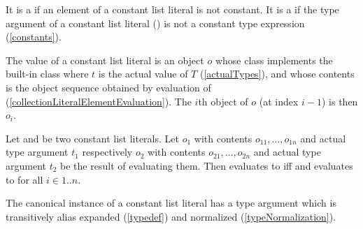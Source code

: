 \documentclass[makeidx]{article}
\begin{document}
{

\LMHash{}%
It is a 
if an element of a constant list literal is not constant.
It is a  if the type argument of a constant list literal
()
is not a constant type expression
(\ref{constants}).


\LMHash{}%
The value of a constant list literal
is an object $o$ whose class implements the built-in class
where $t$ is the actual value of $T$
(\ref{actualTypes}),
and whose contents is the object sequence  obtained by
evaluation of 
(\ref{collectionLiteralElementEvaluation}).
The $i$th object of $o$ (at index $i - 1$) is then $o_i$.

\LMHash{}%
Let 
and 
be two constant list literals.
Let $o_1$ with contents $o_{11}, \ldots, o_{1n}$ and actual type argument $t_1$
respectively
$o_2$ with contents $o_{21}, \ldots, o_{2n}$ and actual type argument $t_2$
be the result of evaluating them.
Then  evaluates to \TRUE{} if{}f
 and 
evaluates to \TRUE{} for all $i \in 1 .. n$.


\LMHash{}%
The canonical instance of a constant list literal has a type argument
which is transitively alias expanded
(\ref{typedef})
and normalized
(\ref{typeNormalization}).

}
\end{document}
